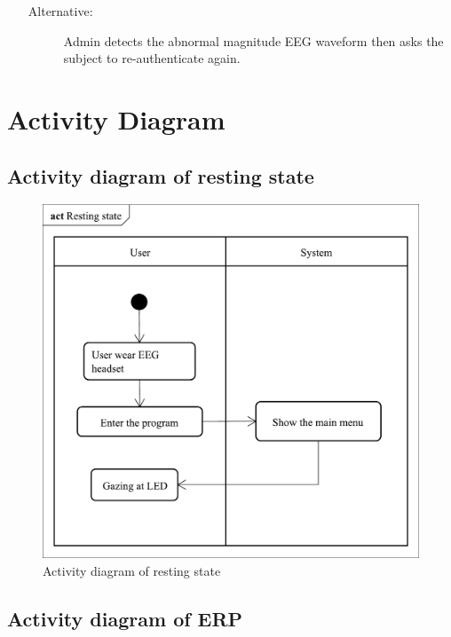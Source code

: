 \begin{itemize}
\begin{description}
{\begin{tabular}{| m{.47\linewidth} | m{.47\linewidth} |}
		\end{tabular}
	}
	\item[Alternative:] Admin detects the abnormal magnitude EEG waveform then asks the subject to re-authenticate again.
	
\end{description}

\end{itemize}

\section{Activity Diagram}


\subsection{Activity diagram of resting state}

\begin{figure}[ht]
\centering \includegraphics[scale=0.295]{chapter4/Rest.pdf}
\caption{Activity diagram of resting state}
\end{figure}



\subsection{Activity diagram of ERP}


